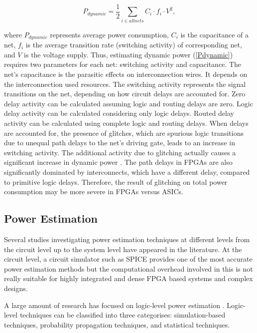 \begin{center}
\begin{equation}
\label{Pdynamic}
 P_{dynamic} =\frac{1}{2} \sum\limits_{i \in all nets} C_{i} \cdot f_{i} \cdot V^2,
\end{equation}
\end{center}
where $P_{dynamic}$ represents average power consumption, $C_{i}$ is the capacitance of a net, $f_{i}$ is the average transition rate (switching activity) of corresponding net, and $V$ is the voltage supply.
Thus, estimating dynamic power (\ref{Pdynamic}) requires two parameters for each net: switching activity and capacitance.
The net's capacitance is the parasitic effects on interconnection wires. It depends on the interconnection used resources.
The switching activity represents the signal transitions on the net, depending on how circuit delays are accounted for.
Zero delay activity can be calculated assuming logic and routing delays are zero. Logic delay activity can be calculated considering only logic delays.
Routed delay activity can be calculated using complete logic and routing delays.
When delays are accounted for, the presence of glitches, which are spurious logic transitions due to unequal path delays to the net’s driving gate, leads to an increase in switching activity.
The additional activity due to glitching actually causes a significant increase in dynamic power \cite{Anderson2004a}.
The path delays in FPGAs are also significantly dominated by interconnects, which have a different delay, compared to primitive logic delays. Therefore, the result of glitching on total power consumption may be more severe in FPGAs versus ASICs. 

\subsection{Power Estimation}

Several studies investigating power estimation techniques at different levels from the circuit level up to the system level have appeared in the literature.
At the circuit level, a circuit simulator such as SPICE \cite{Deng1994} provides one of the most accurate power estimation methods but the computational overhead involved in this is not really suitable for highly integrated and dense FPGA based systems and complex designs. 

A large amount of research has focused on logic-level power estimation \cite{Anderson2004a,Anderson2004,Todorovich2005}. 
Logic-level techniques can be classified into three categorises:  simulation-based techniques,  probability propagation techniques, and statistical techniques.

